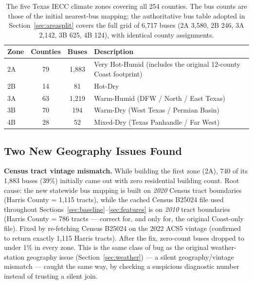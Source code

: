 \documentclass[11pt]{article}
\begin{document}
\begin{table}[H]
\centering
\small
\begin{tabular}{lccl}
\toprule
Zone & Counties & Buses & Description \\
\midrule
2A & 79 & 1{,}883 & Very Hot-Humid (includes the original 12-county Coast footprint) \\
2B & 14 & 81 & Hot-Dry \\
3A & 63 & 1{,}219 & Warm-Humid (DFW / North / East Texas) \\
3B & 70 & 194 & Warm-Dry (West Texas / Permian Basin) \\
4B & 28 & 52 & Mixed-Dry (Texas Panhandle / Far West) \\
\bottomrule
\end{tabular}
\caption{The five Texas IECC climate zones covering all 254 counties. The bus counts
are those of the initial nearest-bus mapping; the authoritative bus table adopted in
Section~\ref{sec:areasplit} covers the full grid of 6{,}717 buses (2A 3{,}580, 2B 246,
3A 2{,}142, 3B 625, 4B 124), with identical county assignments.}
\label{tab:zones}
\end{table}

\subsection{Two New Geography Issues Found}

\textbf{Census tract vintage mismatch.} While building the first zone (2A), 740 of its
1{,}883 buses (39\%) initially came out with zero residential building count. Root
cause: the new statewide bus mapping is built on \emph{2020} Census tract boundaries
(Harris County = 1{,}115 tracts), while the cached Census B25024 file used throughout
Sections~\ref{sec:baseline}--\ref{sec:features} is on \emph{2010} tract boundaries
(Harris County = 786 tracts --- correct for, and only for, the original Coast-only
file). Fixed by re-fetching Census B25024 on the 2022 ACS5 vintage (confirmed to
return exactly 1{,}115 Harris tracts). After the fix, zero-count buses dropped to
under 1\% in every zone. This is the same class of bug as the original weather-station
geography issue (Section~\ref{sec:weather}) --- a silent geography/vintage mismatch ---
caught the same way, by checking a suspicious diagnostic number instead of trusting a
silent join.
\end{document}
